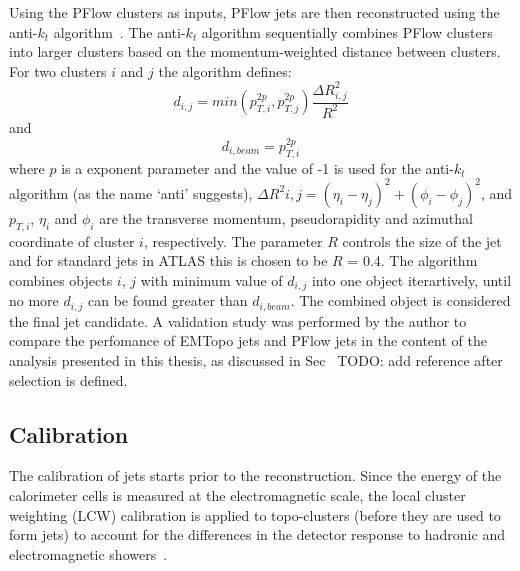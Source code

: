 Using the PFlow clusters as inputs, PFlow jets are then reconstructed
using the anti-$k_t$ algorithm~\cite{Cacciari_2008}. 
The anti-$k_t$ algorithm 
sequentially combines PFlow clusters into larger clusters based on the 
momentum-weighted distance between clusters. 
For two clusters $i$ and $j$ the algorithm defines:
\[  d_{i,j} = min(p_{T,i}^{2p},p_{T,j}^{2p}) \frac{\Delta R_{i,j}^2}{R^2} \]
and 
\[ d_{i,beam} = p_{T,i}^{2p} \]
where $p$ is a exponent parameter and the value of -1 is used
for the anti-$k_t$ algorithm (as the name `anti' suggests),
$\Delta R^2{i,j} = (\eta_i - \eta_j)^2 + (\phi_i - \phi_j)^2 $, 
and $p_{T,i}$, $\eta_i$ and $\phi_i$ are 
the transverse momentum, 
pseudorapidity and azimuthal coordinate
of cluster $i$, respectively. 
The parameter $R$ controls the size of the jet and for standard jets 
in ATLAS this is chosen to be $R$ = 0.4.
The algorithm combines objects $i$, $j$ with minimum value of $d_{i,j}$
into one object iterartively, until no more $d_{i,j}$ can be found greater
than $d_{i,beam}$. The combined object is considered the final jet 
candidate.
A validation study was performed by the author to compare the 
perfomance of EMTopo jets and PFlow jets in the content of 
the analysis presented in this thesis, as discussed in Sec~
TODO: add reference after selection is defined.
\subsection{Calibration}
The calibration of jets starts prior to the reconstruction.
Since the energy of the calorimeter cells is measured at 
the electromagnetic scale, the local cluster weighting 
(LCW) calibration is applied to topo-clusters (before they are
used to form jets) to account for the differences in 
the detector response to hadronic and 
electromagnetic showers~\cite{CERN-PH-EP-2015-304}.

